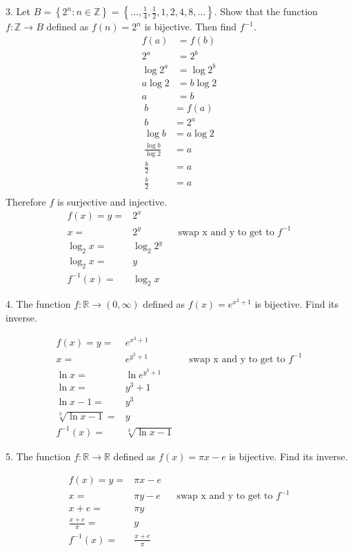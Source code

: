 \documentclass{hippoidC}
\begin{document}
\begin{prooflist}{3. Let $B=\left\{2^n: n \in \mathbb{Z}\right\}=\left\{\ldots,
    \frac{1}{4}, \frac{1}{2}, 1,2,4,8, \ldots\right\}$. Show that the function
$f: \mathbb{Z} \rightarrow B$ defined as $f(n)=2^n$ is bijective. Then find
$f^{-1}$.}
\inj{}
\begin{align*}
    f(a)&=f(b)\\
    2^a&=2^b\\
    \log 2^a&=\log 2^b\\
    a \log 2&=b \log 2\\
    a&=b
\end{align*}
\surj{}
\begin{align*}
    b&=f(a)\\
    b&=2^a\\
    \log b&=a \log 2\\
    \frac{\log b}{\log 2} &= a\\
    \frac{b}{2} &= a\\
    \frac{b}{2} &= a\\
\end{align*}
Therefore $f$ is surjective and injective.
\begin{align*}
    f(x)=y=&2^x\\
    x=&2^y&&\text{swap x and y to get to }f^{-1}\\
    \log_2 x=&\log_2 2^y\\
    \log_2 x=&y\\
    f^{-1}(x) =& \log_2 x
\end{align*}
\end{prooflist}

\begin{prooflist}{4. The function $f: \mathbb{R} \rightarrow(0, \infty)$ defined
    as $f(x)=e^{x^3+1}$ is bijective. Find its inverse.}
    \item
\begin{align*}
    f(x)=y=&e^{x^3+1}\\
    x=&e^{y^3+1}&&\text{swap x and y to get to }f^{-1}\\
    \ln x=&\ln e^{y^3+1}\\
    \ln x=&y^3+1\\
    \ln x-1=&y^3\\
    \sqrt[3]{\ln x-1}=&y\\
    f^{-1}(x) =& \sqrt[3]{\ln x-1}
\end{align*}
\end{prooflist}

\begin{prooflist}{5. The function $f: \mathbb{R} \rightarrow \mathbb{R}$ defined
    as $f(x)=\pi x-e$ is bijective. Find its inverse.}
\item
\begin{align*}
    f(x)=y=&\pi x-e\\
    x=&\pi y-e&&\text{swap x and y to get to }f^{-1}\\
    x+e=&\pi y\\
    \frac{x+e}{\pi}=&y\\
    f^{-1}(x) =& \frac{x+e}{\pi}
\end{align*}
\end{prooflist}
\end{document}
